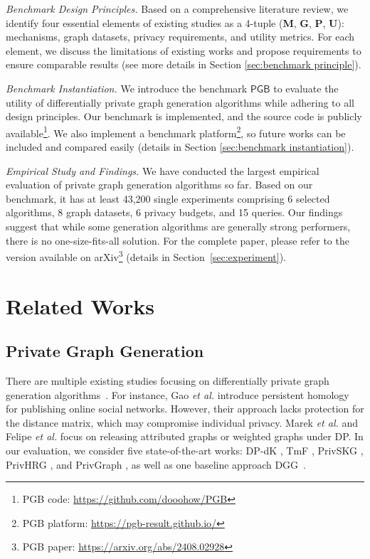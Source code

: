 \documentclass[conference]{IEEEtran}
\theoremstyle{plain}
\begin{document}
\textit{Benchmark Design Principles.}
Based on a comprehensive literature review, we identify four essential elements of existing studies as a 4-tuple (\textbf{M}, \textbf{G}, \textbf{P}, \textbf{U}): mechanisms, graph datasets, privacy requirements, and utility metrics. 
For each element, we discuss the limitations of existing works and propose requirements to ensure comparable results (see more details in Section \ref{sec:benchmark principle}).

\textit{Benchmark Instantiation.}
We introduce the benchmark $\mathsf{PGB}$ to evaluate the utility of differentially private graph generation algorithms while adhering to all design principles. 
Our benchmark is implemented, and the source code is publicly available\footnote{\label{footnote:code}PGB code: \url{https://github.com/dooohow/PGB}}.
We also implement a benchmark platform\footnote{PGB platform: \url{https://pgb-result.github.io/}}, so future works can be included and compared easily (details in Section \ref{sec:benchmark instantiation}).

\textit{Empirical Study and Findings.}
We have conducted the largest empirical evaluation of private graph generation algorithms so far.
Based on our benchmark, it has at least 43,200 single experiments comprising 6 selected algorithms, 8 graph datasets, 6 privacy budgets, and 15 queries.
Our findings suggest that while some generation algorithms are generally strong performers, there is no one-size-fits-all solution.
For the complete paper, please refer to the version available on arXiv\footnote{PGB paper: \url{https://arxiv.org/abs/2408.02928}}
(details in Section~\ref{sec:experiment}).

\section{Related Works}
\label{sec:related works}

\subsection{Private Graph Generation}
There are multiple existing studies focusing on differentially private graph generation algorithms~\cite{wang2013preserving,nguyen2015differentially,chen2014correlated,mir2012differentially,xiao2014differentially,yuan2023privgraph,chen2019publishing,jorgensen2016publishing,zhang2020community,jian2021publishing,qin2017generating,ju2019generating,ye2020lf,wei2020asgldp,hou2023block,liu2020local,gao2019phdp,eliavs2020differentially,brito2023global}.
For instance, Gao \textit{et al.} \cite{gao2019phdp} introduce persistent homology for publishing online social networks. 
However, their approach lacks protection for the distance matrix, which may compromise individual privacy. 
Marek \textit{et al.} \cite{eliavs2020differentially} and Felipe \textit{et al.} \cite{brito2023global} focus on releasing attributed graphs or weighted graphs under DP.
In our evaluation, we consider five state-of-the-art works: DP-dK \cite{wang2013preserving}, TmF \cite{nguyen2015differentially}, PrivSKG \cite{mir2012differentially}, PrivHRG \cite{xiao2014differentially}, and PrivGraph \cite{yuan2023privgraph}, as well as one baseline approach DGG~\cite{qin2017generating}.
\end{document}
